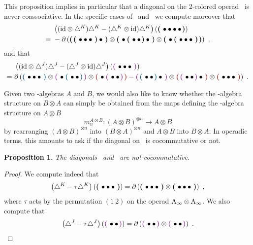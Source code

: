 \documentclass[twoside, 11pt]{amsart}
\newtheorem{proposition}[definition]{Proposition}
\theoremstyle{remark}
\begin{document}
This proposition implies in particular that a diagonal on the 2-colored operad \Ainfdeux\ is never coassociative.
In the specific cases of \diagainf\ and \diagminf\ we compute moreover that
  \begin{align*}
      &\left( (\mathrm{id} \otimes \triangle^{K} ) \triangle^{K} - (\triangle^{K} \otimes \mathrm{id}) \triangle^{K} \right) \left( \boldsymbol{\left(\right.}  \bullet \bullet \bullet \bullet  \boldsymbol{\left.\right)} \right)  \\
      = \  & - \partial \left( \boldsymbol{\left(\right.}  \boldsymbol{\left(\right.}  \bullet \bullet \bullet  \boldsymbol{\left.\right)} \bullet  \boldsymbol{\left.\right)}  \otimes \boldsymbol{\left(\right.}  \bullet \boldsymbol{\left(\right.}  \bullet \bullet  \boldsymbol{\left.\right)} \bullet  \boldsymbol{\left.\right)} \otimes  \boldsymbol{\left(\right.}  \bullet \boldsymbol{\left(\right.}  \bullet \bullet \bullet  \boldsymbol{\left.\right)}  \boldsymbol{\left.\right)} \right) \ ,
  \end{align*}
and that 
\begin{align*}
      &\left( (\ide \otimes \diagminf ) \diagminf - (\diagminf \otimes \ide) \diagminf \right) \left( \purple{\bullet \bullet \bullet} \right)  \\
      = \ &\partial \left( \blue{\bullet \bullet \bullet} \otimes \purple{ \bullet \blue{\bullet \bullet}} \otimes \red{\bullet \purple{\bullet \bullet}}
    - \purple{\blue{\bullet \bullet} \bullet} \otimes \red{\purple{\bullet \bullet} \bullet} \otimes \red{\bullet \bullet \bullet}
  \right) \ .
\end{align*} 
  
Given two \Ainf -algebras $A$ and $B$, we would also like to know whether the \Ainf -algebra structure on $B \otimes A$ can simply be obtained from the maps defining the \Ainf -algebra structure on $A \otimes B$ \[ m_n^{A \otimes B} : ( A \otimes B)^{\otimes n} \rightarrow A \otimes B \] by rearranging $(A \otimes B)^{\otimes n}$ into $(B \otimes A)^{\otimes n}$ and $A \otimes B$ into $B \otimes A$. 
In operadic terms, this amounts to ask if the diagonal on \Ainf\ is cocommutative or not. 

\begin{proposition} \label{prop:not-cocomm}
The diagonals \diagainf\ and \diagminf\ are not cocommutative.
\end{proposition} 

\begin{proof}
We compute indeed that
\[ \left( \triangle^{K} - \tau \triangle^{K} \right) \left( \boldsymbol{\left(\right.}  \bullet \bullet \bullet  \boldsymbol{\left.\right)} \right) = \partial \left( \boldsymbol{\left(\right.}  \bullet \bullet \bullet  \boldsymbol{\left.\right)} \otimes \boldsymbol{\left(\right.}  \bullet \bullet \bullet  \boldsymbol{\left.\right)} \right) \ , \]
where $\tau$ acts by the permutation $(1 \ 2)$ on the operad $\mathrm{A}_\infty \otimes \mathrm{A}_\infty$.
We also compute that
\[ \left( \diagminf - \tau \diagminf \right) \left( \purple{\bullet \bullet} \right) = \partial \left( \purple{\bullet \bullet} \otimes \purple{\bullet \bullet} \right) \ . \]
\end{proof}
\end{document}

